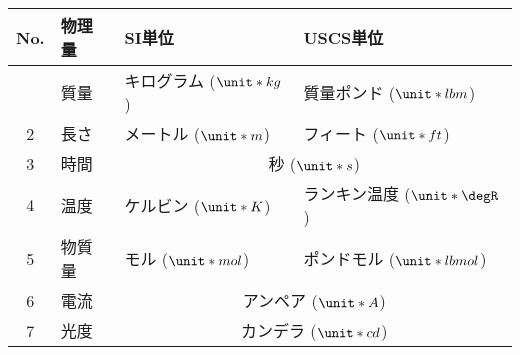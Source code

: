 \begin{tabular}{clll}
\index{SIたんい@SI単位}%
 No. & 物理量 & SI単位 & USCS単位 \\
 \hline
 \tblstrut
 1 & 質量 & キログラム ($\unit*{kg}$) & 質量ポンド ($\unit*{lbm}$) \\
 2 & 長さ & メートル ($\unit*{m}$) & フィート ($\unit*{ft}$) \\
 3 & 時間 & \multicolumn{2}{c}{秒 ($\unit*{s}$)} \\
 4 & 温度 & ケルビン ($\unit*{K}$) & ランキン温度 ($\unit*{\degR}$) \\
 5 & 物質量 & モル ($\unit*{mol}$)\footnotemark & ポンドモル ($\unit*{lbmol}$) \\
 6 & 電流 & \multicolumn{2}{c}{アンペア ($\unit*{A}$)} \\
 7 & 光度 & \multicolumn{2}{c}{カンデラ ($\unit*{cd}$)} \\
 \hline
\end{tabular}

